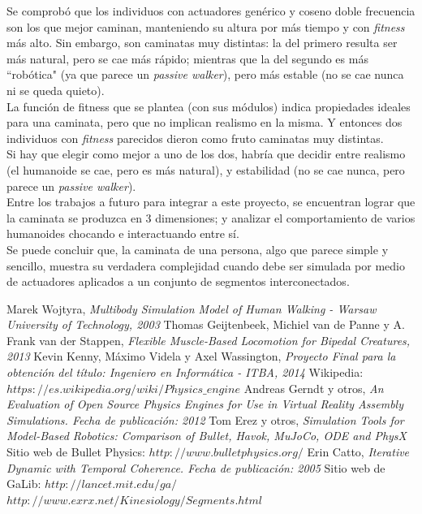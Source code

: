 \documentclass{article}
\begin{document}
Se comprob\'o que los individuos con actuadores gen\'erico y coseno doble frecuencia son los que mejor caminan, manteniendo su altura por m\'as tiempo y con \textit{fitness} m\'as alto. Sin embargo, son caminatas muy distintas: la del primero resulta ser m\'as natural, pero se cae m\'as r\'apido; mientras que la del segundo es m\'as ``rob\'otica" (ya que parece un \textit{passive walker}), pero m\'as estable (no se cae nunca ni se queda quieto).\\
La funci\'on de fitness que se plantea (con sus m\'odulos) indica propiedades ideales para una caminata, pero que no implican realismo en la misma. Y entonces dos individuos con \textit{fitness} parecidos dieron como fruto caminatas muy distintas.\\
Si hay que elegir como mejor a uno de los dos, habr\'ia que decidir entre realismo (el humanoide se cae, pero es m\'as natural), y estabilidad (no se cae nunca, pero parece un \textit{passive walker}).\\
Entre los trabajos a futuro para integrar a este proyecto, se encuentran lograr que la caminata se produzca en 3 dimensiones; y analizar el comportamiento de varios humanoides chocando e  interactuando entre s\'i.\\
Se puede concluir que, la caminata de una persona, algo que parece simple y sencillo, muestra su verdadera complejidad cuando debe ser simulada por medio de actuadores aplicados a un conjunto de segmentos interconectados.



\begin{thebibliography}{1}
Marek Wojtyra, \emph{Multibody Simulation Model of Human Walking - Warsaw University of Technology, 2003}
Thomas Geijtenbeek, Michiel van de Panne y A. Frank van der Stappen, \emph{Flexible Muscle-Based Locomotion for Bipedal Creatures, 2013 }
Kevin Kenny, M\'aximo Videla y Axel Wassington, \emph{Proyecto Final para la obtenci\'on del t\'itulo: Ingeniero en Inform\'atica - ITBA, 2014}
 Wikipedia: $https://es.wikipedia.org/wiki/Physics\_engine$
Andreas Gerndt y otros, \emph{An Evaluation of Open Source Physics Engines for Use in Virtual Reality Assembly Simulations. Fecha de publicaci\'on: 2012}
Tom Erez y otros, \emph{Simulation Tools for Model-Based Robotics: Comparison of \textit{Bullet}, Havok, MuJoCo, ODE and PhysX}
 Sitio web de Bullet Physics: $http://www.bulletphysics.org/$
Erin Catto, \emph{Iterative Dynamic with Temporal Coherence. Fecha de publicaci\'on: 2005}
 Sitio web de GaLib: $http://lancet.mit.edu/ga/$
 $http://www.exrx.net/Kinesiology/Segments.html$

\end{thebibliography}

\end{document}
